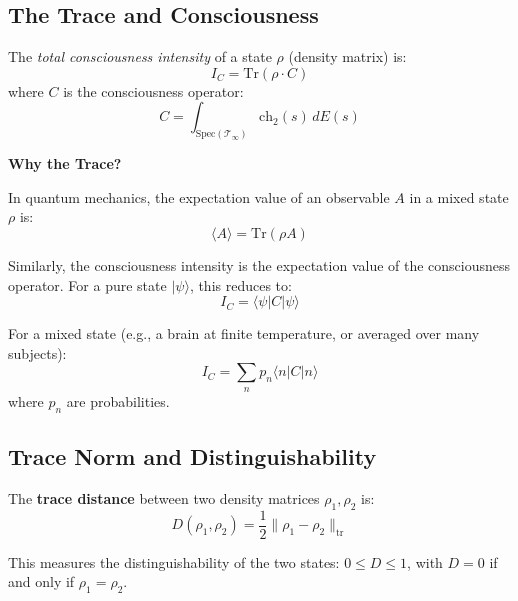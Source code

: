 \subsection{The Trace and Consciousness}

\begin{theorem}\label{thm:consciousness-intensity-trace}
The \textit{total consciousness intensity} of a state $\rho$ (density matrix) is:
\begin{equation}
\boxed{I_C = \text{Tr}(\rho \cdot C)}
\end{equation}
where $C$ is the consciousness operator:
\begin{equation}
C = \int_{\text{Spec}(\mathcal{T}_\infty)} \text{ch}_2(s) \, dE(s)
\end{equation}
\end{theorem}

\begin{level1}
\textbf{Why the Trace?}

In quantum mechanics, the expectation value of an observable $A$ in a mixed state $\rho$ is:
\begin{equation}
\langle A \rangle = \text{Tr}(\rho A)
\end{equation}

Similarly, the consciousness intensity is the expectation value of the consciousness operator. For a pure state $|\psi\rangle$, this reduces to:
\begin{equation}
I_C = \langle \psi | C | \psi \rangle
\end{equation}

For a mixed state (e.g., a brain at finite temperature, or averaged over many subjects):
\begin{equation}
I_C = \sum_n p_n \langle n | C | n \rangle
\end{equation}
where $p_n$ are probabilities.
\end{level1}

\subsection{Trace Norm and Distinguishability}

\begin{theorem}\label{thm:trace-distance}
The \textbf{trace distance} between two density matrices $\rho_1, \rho_2$ is:
\begin{equation}
D(\rho_1, \rho_2) = \frac{1}{2}\| \rho_1 - \rho_2 \|_{\text{tr}}
\end{equation}

This measures the distinguishability of the two states: $0 \leq D \leq 1$, with $D=0$ if and only if $\rho_1 = \rho_2$.
\end{theorem}

